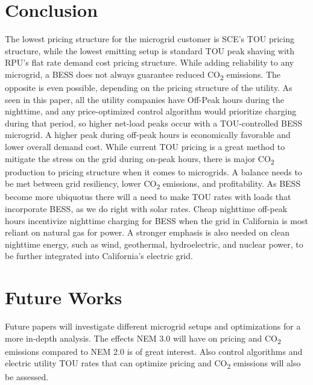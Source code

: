 \documentclass[conference]{IEEEtran}
\begin{document}
	\section{Conclusion}
	 The lowest pricing structure for the microgrid customer is SCE's TOU pricing structure, while the lowest emitting setup is standard TOU peak shaving with RPU's flat rate demand cost pricing structure. While adding reliability to any microgrid, a BESS does not always guarantee reduced CO\textsubscript{2} emissions. The opposite is even possible, depending on the pricing structure of the utility. As seen in this paper, all the utility companies have Off-Peak hours during the nighttime, and any price-optimized control algorithm would prioritize charging during that period, so higher net-load peaks occur with a TOU-controlled BESS microgrid. A higher peak during off-peak hours is economically favorable and lower overall demand cost. While current TOU pricing is a great method to mitigate the stress on the grid during on-peak hours, there is major CO\textsubscript{2} production to pricing structure when it comes to microgrids. A balance needs to be met between grid resiliency, lower CO\textsubscript{2} emissions, and profitability. As BESS become more ubiquotus there will a need to make TOU rates with loads that incorporate BESS, as we do right with solar rates. Cheap nighttime off-peak hours incentivize nighttime charging for BESS when the grid in California is most reliant on natural gas for power. A stronger emphasis is also needed on clean nighttime energy, such as wind, geothermal, hydroelectric, and nuclear power, to be further integrated into California's electric grid.
	\section{Future Works}
	Future papers will investigate different microgrid setups and optimizations for a more in-depth analysis.  The effects NEM 3.0 will have on pricing and CO\textsubscript{2} emissions compared to NEM 2.0 is of great interest. Also control algorithms and electric utility TOU rates that can optimize pricing and CO\textsubscript{2} emissions will also be assessed. 
		
		
		
\end{document}
